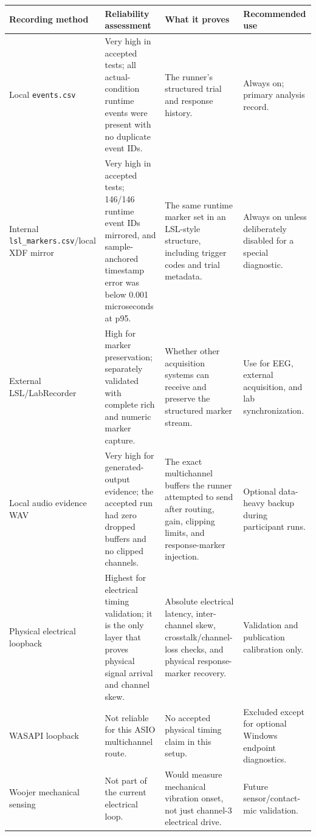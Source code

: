 \documentclass[11pt]{article}
\begin{document}
\begin{longtable}{|p{}|p{}|p{}|p{}|}
\hline
\textbf{Recording method} & \textbf{Reliability assessment} & \textbf{What it proves} & \textbf{Recommended use} \\
\hline
Local \texttt{events.csv} & Very high in accepted tests; all actual-condition
runtime events were present with no duplicate event IDs. & The runner's
structured trial and response history. & Always on; primary analysis record. \\
\hline
Internal \texttt{lsl\_markers.csv}/local XDF mirror & Very high in accepted
tests; 146/146 runtime event IDs mirrored, and sample-anchored timestamp error
was below 0.001 microseconds at p95. & The same runtime marker set in an
LSL-style structure, including trigger codes and trial metadata. & Always on
unless deliberately disabled for a special diagnostic. \\
\hline
External LSL/LabRecorder & High for marker preservation; separately validated
with complete rich and numeric marker capture. & Whether other acquisition
systems can receive and preserve the structured marker stream. & Use for EEG,
external acquisition, and lab synchronization. \\
\hline
Local audio evidence WAV & Very high for generated-output evidence; the accepted
run had zero dropped buffers and no clipped channels. & The exact multichannel
buffers the runner attempted to send after routing, gain, clipping limits, and
response-marker injection. & Optional data-heavy backup during participant
runs. \\
\hline
Physical electrical loopback & Highest for electrical timing validation; it is
the only layer that proves physical signal arrival and channel skew. & Absolute
electrical latency, inter-channel skew, crosstalk/channel-loss checks, and
physical response-marker recovery. & Validation and publication calibration
only. \\
\hline
WASAPI loopback & Not reliable for this ASIO multichannel route. & No accepted
physical timing claim in this setup. & Excluded except for optional Windows
endpoint diagnostics. \\
\hline
Woojer mechanical sensing & Not part of the current electrical loop. & Would
measure mechanical vibration onset, not just channel-3 electrical drive. &
Future sensor/contact-mic validation. \\
\hline
\end{longtable}
\end{document}
